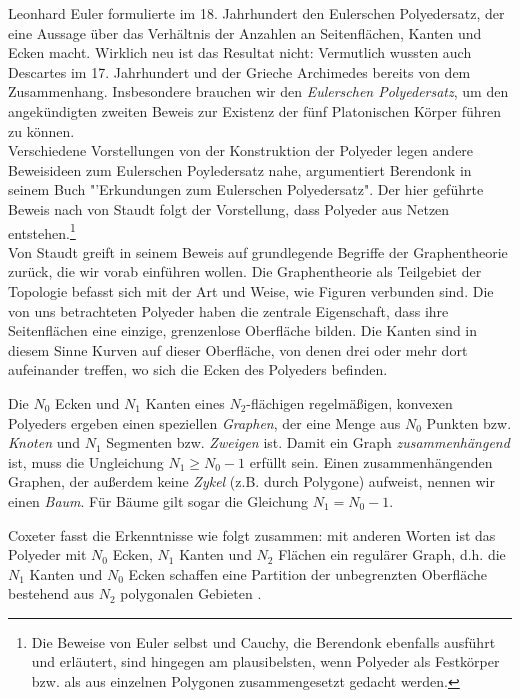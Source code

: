 Leonhard Euler formulierte im 18. Jahrhundert den Eulerschen Polyedersatz, der eine Aussage über das Verhältnis der Anzahlen an Seitenflächen, Kanten und Ecken macht. Wirklich neu ist das Resultat nicht: Vermutlich wussten auch Descartes im 17. Jahrhundert und der Grieche Archimedes bereits von dem Zusammenhang. Insbesondere brauchen wir den \textit{Eulerschen Polyedersatz}, um den angekündigten zweiten Beweis zur Existenz der fünf Platonischen Körper führen zu können.\\
Verschiedene Vorstellungen von der Konstruktion der Polyeder legen andere Beweisideen zum Eulerschen Poyledersatz nahe, argumentiert Berendonk in seinem Buch "'Erkundungen zum Eulerschen Polyedersatz". \citep[vgl.][39]{Berendonk2014} Der hier geführte Beweis nach von Staudt folgt der Vorstellung, dass Polyeder aus Netzen entstehen.\footnote{Die Beweise von Euler selbst und Cauchy, die Berendonk ebenfalls ausführt und erläutert, sind hingegen am plausibelsten, wenn Polyeder als Festkörper bzw. als aus einzelnen Polygonen zusammengesetzt gedacht werden.}\\
Von Staudt greift in seinem Beweis auf grundlegende Begriffe der Graphentheorie zurück, die wir vorab einführen wollen. Die Graphentheorie als Teilgebiet der Topologie befasst sich mit der Art und Weise, wie Figuren verbunden sind. Die von uns betrachteten Polyeder haben die zentrale Eigenschaft, dass ihre Seitenflächen eine einzige, grenzenlose Oberfläche bilden. Die Kanten sind in diesem Sinne Kurven auf dieser Oberfläche, von denen drei oder mehr dort aufeinander treffen, wo sich die Ecken des Polyeders befinden.
\begin{bem}
Die $N_0$ Ecken und $N_1$ Kanten eines $N_2$-flächigen regelmäßigen, konvexen Polyeders ergeben einen speziellen \textit{Graphen}, der eine Menge aus $N_0$ Punkten bzw. \textit{Knoten} und $N_1$ Segmenten bzw. \textit{Zweigen} ist. Damit ein Graph \textit{zusammenhängend} ist, muss die Ungleichung $N_{1} \geq N_{0}-1$ erfüllt sein.
Einen zusammenhängenden Graphen, der außerdem keine \textit{Zykel} (z.B. durch Polygone) aufweist, nennen wir einen \textit{Baum}. Für Bäume gilt sogar die Gleichung $N_{1} = N_{0}-1$.
\end{bem}
Coxeter fasst die Erkenntnisse wie folgt zusammen: mit anderen Worten ist das Polyeder mit $N_0$ Ecken, $N_1$ Kanten und $N_2$ Flächen ein regulärer Graph, d.h. die $N_1$ Kanten und $N_0$ Ecken schaffen eine Partition der unbegrenzten Oberfläche bestehend aus $N_2$ polygonalen Gebieten \citep[6]{Coxeter1973}.\\
